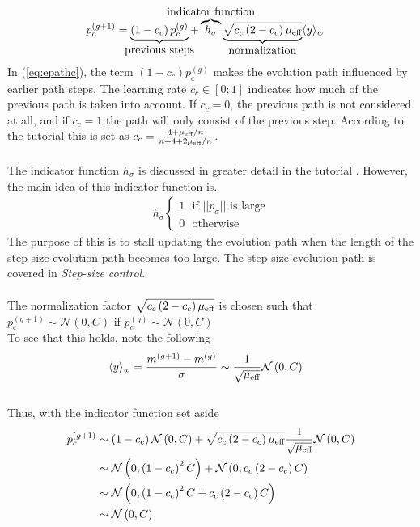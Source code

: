 \begin{align}
p_{c}^{(g+1)} &= \underbrace{\left( 1 - c_{c} \right) 
p_{c}^{(g)}}_{\makebox[0pt]{\text{previous steps}}}  + 
\overbrace{h_{\sigma}}^{\makebox[0pt]{\text{{indicator function}}}}
\underbrace{\sqrt{c_{c} \left( 2 - c_{c} \right) \offspringNumber_{\text{eff}}}}_{
\makebox[0pt]{\text{normalization}}
}
\langle y \rangle_{w} \label{eq:epathc}
\end{align}
In (\ref{eq:epathc}), the term $\left( 1 - c_{c} \right) p_{c}^{(g)}$ makes 
the evolution path influenced by earlier path steps. The learning rate
$c_c \in [0;1] $ indicates how much of the previous path is taken into account.
If $c_c = 0$, the previous path is not considered at all, and if $c_c = 1$ the path 
will only consist of the previous step. According to the tutorial this is set as
$c_c = \frac{4 + \mu_{\text{eff}} / n}{n + 4 + 2 \mu_{\text{eff}} / n}$.\\
\\
The indicator function $h_{\sigma}$ is discussed in greater detail in the tutorial \citep{hansen2011}.
However, the main idea of this indicator function is.
\begin{align}
h_{\sigma}
\begin{cases} 1\ \ \ \text{if $||p_{\sigma}||$ is large} \\
              0\ \ \ \text{otherwise} %
\end{cases}
\end{align}
The purpose of this is to stall updating the evolution path when 
the length of the step-size evolution path becomes too large. The step-size
evolution path is covered in \textit{Step-size control}.\\
\\
The normalization factor 
$\sqrt{c_{c} \left( 2 - c_{c} \right) \mu_{\text{eff}}}$ is chosen such that
$p^{(g+1)}_{c} \sim \mathcal{N}\left(0, C \right)$ if $p_c^{(g)} \sim \mathcal{N} 
\left(0, C\right)$\\
To see that this holds, note the following
\begin{align}
\langle y \rangle_{w} &= \frac{m^{(g+1)} - m^{(g)}}{\sigma}
\sim \frac{1}{\sqrt{\mu_{\text{eff}}}}  \mathcal{N}\left(0, C \right)
\end{align}
\\
Thus, with the indicator function set aside
\begin{align}
p_{c}^{(g+1)} &\sim \left( 1 - c_{c} \right) 
\mathcal{N}\left(0, C \right) + 
\sqrt{c_{c} \left( 2 - c_{c} \right) \mu_{\text{eff}}}
\frac{1}{\sqrt{\mu_{\text{eff}}}}\mathcal{N}\left(0, C \right) \label{eq:nomalization_start}\\
&\sim
\mathcal{N}\left(0, \left( 1 - c_{c} \right)^2 C \right) + 
\mathcal{N}\left(0, c_{c} \left( 2 - c_{c} \right)  C \right)\\
&\sim
\mathcal{N}\left(0, \left( 1 - c_{c} \right)^2 C + c_{c} \left( 2 - c_{c} \right)  C  \right)\\
&\sim \mathcal{N}\left( 0, C \right) \label{eq:nomalization_end}
\end{align}
